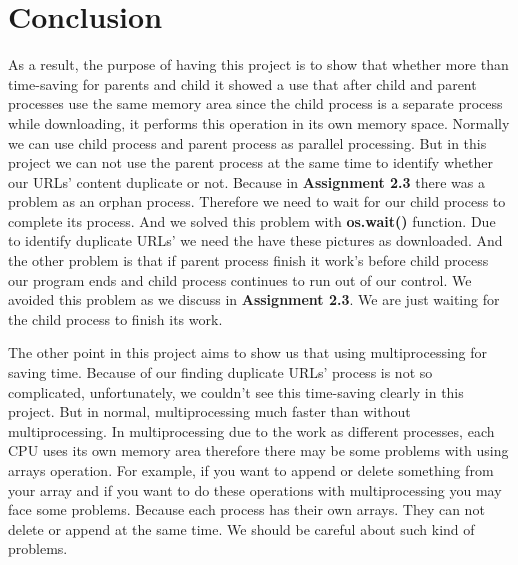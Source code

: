 \documentclass[onecolumn]{article}
\begin{document}
\section{Conclusion}
\setlength{\parskip}{1em}As a result, the purpose of having this project is to show that whether more than time-saving for parents and child it showed a use that after child and parent processes use the same memory area since the child process is a separate process while downloading, it performs this operation in its own memory space. Normally we can use child process and parent process as parallel processing. But in this project we can not use the parent process at the same time to identify whether our URLs' content duplicate or not. Because in \textbf{Assignment 2.3} there was a problem as an orphan process. Therefore we need to wait for our child process to complete its process. And we solved this problem with \textbf{os.wait()} function. Due to identify duplicate URLs' we need the have these pictures as downloaded. And the other problem is that if parent process finish it work's before child process our program ends and child process continues to run out of our control. We avoided this problem as we discuss in \textbf{Assignment 2.3}. We are just waiting for the child process to finish its work.

The other point in this project aims to show us that using multiprocessing for saving time. Because of our finding duplicate URLs' process is not so complicated, unfortunately, we couldn't see this time-saving clearly in this project. But in normal, multiprocessing much faster than without multiprocessing. In multiprocessing due to the work as different processes, each CPU uses its own memory area therefore there may be some problems with using arrays operation. For example, if you want to append or delete something from your array and if you want to do these operations with multiprocessing you may face some problems. Because each process has their own arrays. They can not delete or append at the same time. We should be careful about such kind of problems.
\end{document}
